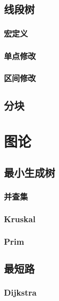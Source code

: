 \documentclass[twocolumn,a4]{article}%
\begin{document}
\subsection{线段树}
    \subsubsection{宏定义}
    
    \subsubsection{单点修改}
    
    \subsubsection{区间修改}
    
\subsection{分块}

\section{图论}
\subsection{最小生成树}
    \subsubsection{并查集}
    
    \subsubsection{Kruskal}
    
    \subsubsection{Prim}
    
\subsection{最短路}
    \subsubsection{Dijkstra}
    
\end{document}
